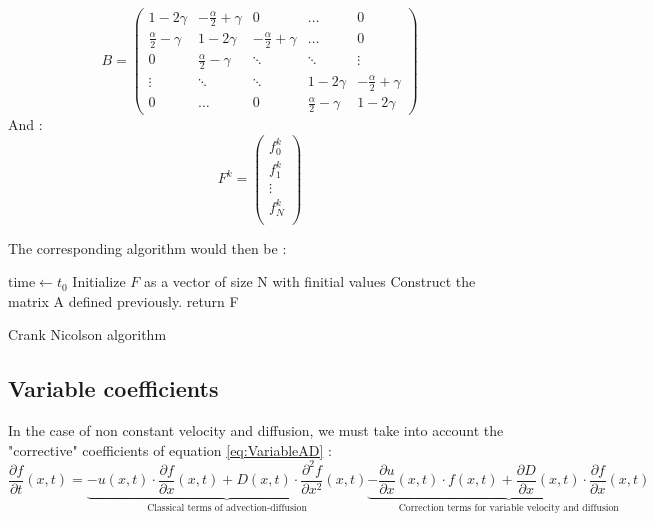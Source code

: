 \documentclass[11pt,a4paper]{article}
\begin{document}
\[
B = \begin{pmatrix}
      1-2\gamma & -\frac{\alpha}{2} + \gamma & 0   & \dots     & 0   \\
      \frac{\alpha}{2} -  \gamma & 1-2\gamma       & -\frac{\alpha}{2} + \gamma   & \dots     & 0 \\
      0&         \frac{\alpha}{2} -  \gamma& \ddots         & \ddots    & \vdots    \\
      \vdots&         \ddots&           \ddots &     1-2\gamma      & -\frac{\alpha}{2} + \gamma  \\
      0&         \dots&           0&          \frac{\alpha}{2} -  \gamma & 1-2\gamma
  \end{pmatrix}
\]
And : \[
F^k =  \begin{pmatrix}
f_0^k \\
f_1^k \\
\vdots \\
f_N^k \\
\end{pmatrix}
\]


The corresponding algorithm would then be :

\IncMargin{1em}
\begin{algorithm}[H]
	\BlankLine
	$\text{time} \leftarrow  t_0$ \;
	Initialize $F$ as a vector of size N with f{initial} values\;
	Construct the matrix A defined previously.
	\BlankLine
	\BlankLine
	return F
	
	
\caption{Crank Nicolson algorithm}\label{alg:cn}
\end{algorithm}
\DecMargin{1em}

\subsection{Variable coefficients}
In the case of non constant velocity and diffusion, we must take into account the "corrective" coefficients of equation \ref{eq:VariableAD} : 
	\[ \frac{\partial f}{\partial t}(x, t) =  \underbrace{- u(x,t) \cdot \frac{\partial f}{\partial x}(x,t) 
	+ D(x,t) \cdot \frac{\partial^2 f}{\partial x^2}(x,t)}_{\text{Classical terms of advection-diffusion}}
	 \underbrace{- \frac{\partial u}{\partial x}(x,t) \cdot f(x,t)
	+ \frac{\partial D}{\partial x}(x,t) \cdot \frac{\partial f}{\partial x}(x,t)}_{\text{Correction terms for variable velocity and diffusion}}\]
\end{document}
